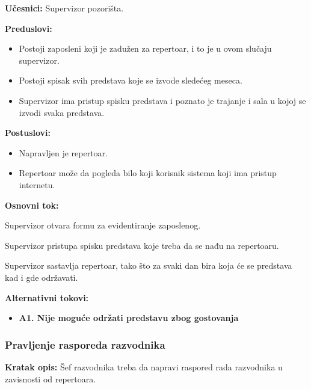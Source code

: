 \documentclass[a4paper]{article}
\begin{document}
\noindent\textbf{Učesnici:} Supervizor pozorišta.

\noindent\textbf{Preduslovi:}
  \begin{itemize}
    \item Postoji zaposleni koji je zadužen za repertoar, i to je u ovom slučaju supervizor.
    \item Postoji spisak svih predstava koje se izvode sledećeg meseca.
    \item Supervizor ima pristup spisku predstava i poznato je trajanje i sala u kojoj se izvodi svaka predstava.
  \end{itemize}

\noindent\textbf{Postuslovi:} 
  \begin{itemize}
    \item Napravljen je repertoar.
    \item Repertoar može da pogleda bilo koji korisnik sistema koji ima pristup internetu.
  \end{itemize}

\noindent\textbf{Osnovni tok:}
  \begin{legal}
    \item Supervizor otvara formu za evidentiranje zaposlenog.
    \item Supervizor pristupa spisku predstava koje treba da se nađu na repertoaru.
    \item Supervizor sastavlja repertoar, tako što za svaki dan bira koja će se predstava kad i gde održavati.  
  \end{legal}

\noindent\textbf{Alternativni tokovi:} 
\begin{itemize}
  \item \textbf{A1. Nije moguće održati predstavu zbog gostovanja} 
\end{itemize}

\subsubsection{Pravljenje rasporeda razvodnika} 
\noindent\textbf{Kratak opis:} Šef razvodnika treba da napravi raspored rada razvodnika u zavisnosti od repertoara.
\end{document}
